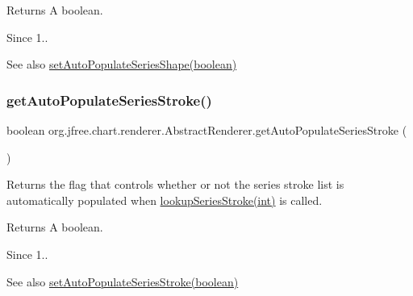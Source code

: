 \begin{DoxyReturn}{Returns}
A boolean.
\end{DoxyReturn}
\begin{DoxySince}{Since}
1..
\end{DoxySince}
\begin{DoxySeeAlso}{See also}
\mbox{\hyperlink{classorg_1_1jfree_1_1chart_1_1renderer_1_1_abstract_renderer_abb8c6c6a7bf35579a1bb6284d2a70c1c}{set\+Auto\+Populate\+Series\+Shape(boolean)}} 
\end{DoxySeeAlso}
\mbox{\label{classorg_1_1jfree_1_1chart_1_1renderer_1_1_abstract_renderer_adbbbcbf044e84a629e488d904f88442e}} 
\subsubsection{\texorpdfstring{get\+Auto\+Populate\+Series\+Stroke()}{getAutoPopulateSeriesStroke()}}
{\footnotesize\ttfamily boolean org.\+jfree.\+chart.\+renderer.\+Abstract\+Renderer.\+get\+Auto\+Populate\+Series\+Stroke (\begin{DoxyParamCaption}{ }\end{DoxyParamCaption})}

Returns the flag that controls whether or not the series stroke list is automatically populated when \mbox{\hyperlink{classorg_1_1jfree_1_1chart_1_1renderer_1_1_abstract_renderer_a883eab51fd555ce119249384790c6d10}{lookup\+Series\+Stroke(int)}} is called.

\begin{DoxyReturn}{Returns}
A boolean.
\end{DoxyReturn}
\begin{DoxySince}{Since}
1..
\end{DoxySince}
\begin{DoxySeeAlso}{See also}
\mbox{\hyperlink{classorg_1_1jfree_1_1chart_1_1renderer_1_1_abstract_renderer_aa6fc1f6e57125ab3c30523424b3123bd}{set\+Auto\+Populate\+Series\+Stroke(boolean)}} 
\end{DoxySeeAlso}
\mbox{\label{classorg_1_1jfree_1_1chart_1_1renderer_1_1_abstract_renderer_a44d0d70c2ce52e48ba1ccafade04693b}} 
